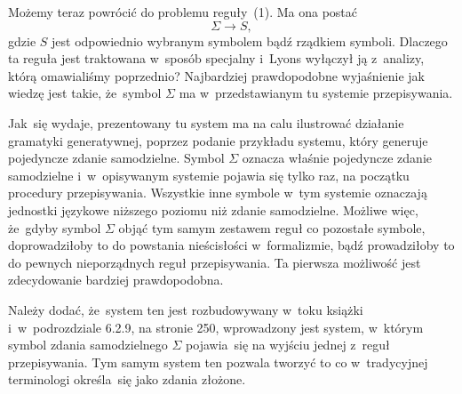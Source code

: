 \documentclass[a4paper,11pt]{article}
\begin{document}
Możemy teraz powrócić do problemu reguły~(1). Ma ona postać
\begin{equation}
  \label{eq:Lyons-Wstep-do-jezykoznawstwa-07}
  \Sigma \to S,
\end{equation}
gdzie $S$ jest odpowiednio wybranym symbolem bądź rządkiem symboli. Dlaczego
ta reguła jest traktowana w~sposób specjalny i~Lyons wyłączył ją z~analizy,
którą omawialiśmy poprzednio? Najbardziej prawdopodobne wyjaśnienie jak
wiedzę jest takie, że~symbol $\Sigma$ ma w~przedstawianym tu systemie
przepisywania.

Jak~się wydaje, prezentowany tu system ma na calu ilustrować działanie
gramatyki generatywnej, poprzez podanie przykładu systemu, który generuje
pojedyncze zdanie samodzielne. Symbol $\Sigma$ oznacza właśnie pojedyncze zdanie
samodzielne i~w~opisywanym systemie pojawia się tylko raz, na początku
procedury przepisywania. Wszystkie inne symbole w~tym systemie oznaczają
jednostki językowe niższego poziomu niż zdanie samodzielne. Możliwe więc,
że~gdyby symbol $\Sigma$ objąć tym samym zestawem reguł co pozostałe symbole,
doprowadziłoby to do powstania nieścisłości w~formalizmie, bądź prowadziłoby
to do pewnych nieporządnych reguł przepisywania. Ta pierwsza możliwość jest
zdecydowanie bardziej prawdopodobna.

Należy dodać, że~system ten jest rozbudowywany w~toku książki
i~w~podrozdziale 6.2.9, na stronie 250, wprowadzony jest system, w~którym
symbol zdania samodzielnego $\Sigma$ pojawia~się na wyjściu jednej z~reguł
przepisywania. Tym samym system ten pozwala tworzyć to co w~tradycyjnej terminologi określa~się jako zdania złożone.

\vspace{\spaceFour}





\newpage


\vspace{\spaceFive}
\end{document}
